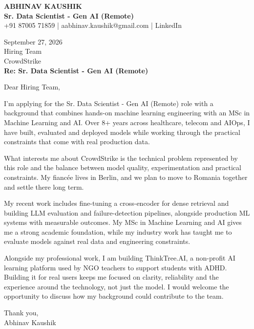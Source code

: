 \documentclass[10pt,a4paper]{article}
\begin{document}
\begin{center}
{\Large\bfseries ABHINAV KAUSHIK}\\[2pt]
{\bfseries Sr. Data Scientist - Gen AI (Remote)}\\[2pt]
+91 87005 71859 \quad | \quad aabhinav.kaushik@gmail.com \quad | \quad LinkedIn
\end{center}
\vspace{8pt}
September 27, 2026\\[6pt]
Hiring Team\\
CrowdStrike\\[4pt]
\textbf{Re: Sr. Data Scientist - Gen AI (Remote)}

Dear Hiring Team,

I’m applying for the Sr. Data Scientist - Gen AI (Remote) role with a background that combines hands-on machine learning engineering with an MSc in Machine Learning and AI. Over 8+ years across healthcare, telecom and AIOps, I have built, evaluated and deployed models while working through the practical constraints that come with real production data.

What interests me about CrowdStrike is the technical problem represented by this role and the balance between model quality, experimentation and practical constraints. My fiancée lives in Berlin, and we plan to move to Romania together and settle there long term.

My recent work includes fine-tuning a cross-encoder for dense retrieval and building LLM evaluation and failure-detection pipelines, alongside production ML systems with measurable outcomes. My MSc in Machine Learning and AI gives me a strong academic foundation, while my industry work has taught me to evaluate models against real data and engineering constraints.

Alongside my professional work, I am building ThinkTree.AI, a non-profit AI learning platform used by NGO teachers to support students with ADHD. Building it for real users keeps me focused on clarity, reliability and the experience around the technology, not just the model. I would welcome the opportunity to discuss how my background could contribute to the team.

Thank you,\\
Abhinav Kaushik
\end{document}
